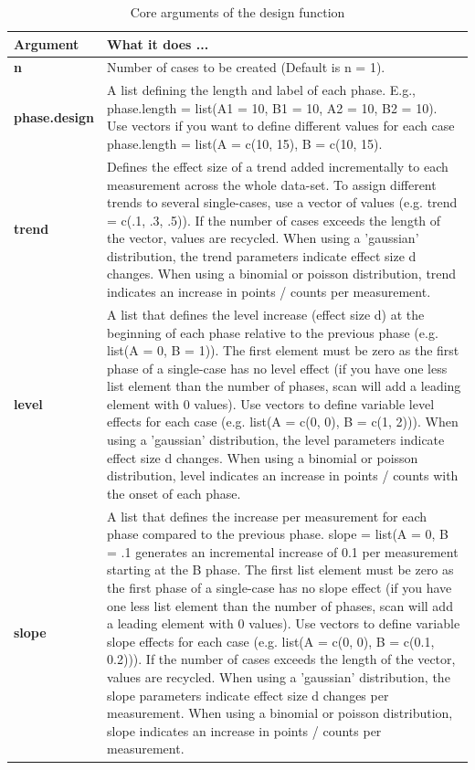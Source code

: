 \documentclass[
]{book}
\begin{document}
\begin{table}

\caption{\label{tab:design-arguments}Core arguments of the design function}
\begin{tabular}[t]{>{\raggedright\arraybackslash}p{15em}>{\raggedright\arraybackslash}p{30em}}
\toprule
Argument & What it does ...\\
\midrule
\textbf{n} & Number of cases to be created (Default is n = 1).\\
\textbf{phase.design} & A list defining the length and label of each phase. E.g., phase.length = list(A1 = 10, B1 = 10, A2 = 10, B2 = 10). Use vectors if you want to define different values for each case phase.length = list(A = c(10, 15), B = c(10, 15).\\
\textbf{trend} & Defines the effect size of a trend added incrementally to each measurement across the whole data-set. To assign different trends to several single-cases, use a vector of values (e.g. trend = c(.1, .3, .5)). If the number of cases exceeds the length of the vector, values are recycled. When using a 'gaussian' distribution, the trend parameters indicate effect size d changes. When using a binomial or poisson distribution, trend indicates an increase in points / counts per measurement.\\
\textbf{level} & A list that defines the level increase (effect size d) at the beginning of each phase relative to the previous phase (e.g. list(A = 0, B = 1)). The first element must be zero as the first phase of a single-case has no level effect (if you have one less list element than the number of phases, scan will add a leading element with 0 values). Use vectors to define variable level effects for each case (e.g. list(A = c(0, 0), B = c(1, 2))). When using a 'gaussian' distribution, the level parameters indicate effect size d changes. When using a binomial or poisson distribution, level indicates an increase in points / counts with the onset of each phase.\\
\textbf{slope} & A list that defines the increase per measurement for each phase compared to the previous phase. slope = list(A = 0, B = .1 generates an incremental increase of 0.1 per measurement starting at the B phase. The first list element must be zero as the first phase of a single-case has no slope effect (if you have one less list element than the number of phases, scan will add a leading element with 0 values). Use vectors to define variable slope effects for each case (e.g. list(A = c(0, 0), B = c(0.1, 0.2))). If the number of cases exceeds the length of the vector, values are recycled. When using a 'gaussian' distribution, the slope parameters indicate effect size d changes per measurement. When using a binomial or poisson distribution, slope indicates an increase in points / counts per measurement.\\

\end{tabular}
\end{table}
\end{document}
